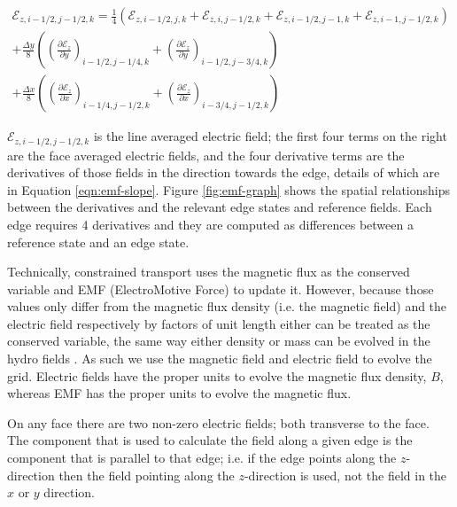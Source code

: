 \documentclass[modern]{aastex631}
\begin{document}
\begin{equation}
    \label{eqn:emf-edge}
    \begin{aligned}
        \mathcal{E}_{z, i-1/2, j-1/2, k} = \frac{1}{4} \left(
              \mathcal{E}_{z, i-1/2, j, k}
            + \mathcal{E}_{z, i, j-1/2, k}
            + \mathcal{E}_{z, i-1/2, j-1, k}
            + \mathcal{E}_{z, i-1, j-1/2, k}\right) \\
        + \frac{\Delta y}{8} \left( \left( \frac{\partial \mathcal{E}_z }{\partial y} \right)_{i-1/2, j-1/4, k} + \left(  \frac{\partial \mathcal{E}_z }{\partial y} \right)_{i-1/2, j-3/4, k} \right) \\
        + \frac{\Delta x}{8} \left( \left( \frac{\partial \mathcal{E}_z }{\partial x} \right)_{i-1/4, j-1/2, k} + \left(  \frac{\partial \mathcal{E}_z }{\partial x} \right)_{i-3/4, j-1/2, k} \right)
    \end{aligned}
\end{equation}

$\mathcal{E}_{z, i-1/2, j-1/2, k}$ is the line averaged electric field; the first four terms on the right are the face averaged electric fields, and the four derivative terms are the derivatives of those fields in the direction towards the edge, details of which are in Equation \ref{eqn:emf-slope}. Figure \ref{fig:emf-graph} shows the spatial relationships between the derivatives and the relevant edge states and reference fields. Each edge requires 4 derivatives and they are computed as differences between a reference state and an edge state.

Technically, constrained transport uses the magnetic flux as the conserved variable and EMF (ElectroMotive Force) to update it. However, because those values only differ from the magnetic flux density (i.e. the magnetic field) and the electric field respectively by factors of unit length either can be treated as the conserved variable, the same way either density or mass can be evolved in the hydro fields \citep{stone_athena_2008}. As such we use the magnetic field and electric field to evolve the grid. Electric fields have the proper units to evolve the magnetic flux density, $ B $, whereas EMF has the proper units to evolve the magnetic flux.

On any face there are two non-zero electric fields; both transverse to the face. The component that is used to calculate the field along a given edge is the component that is parallel to that edge; i.e. if the edge points along the $ z $-direction then the field pointing along the $ z $-direction is used, not the field in the $ x $ or $ y $ direction.
\end{document}
